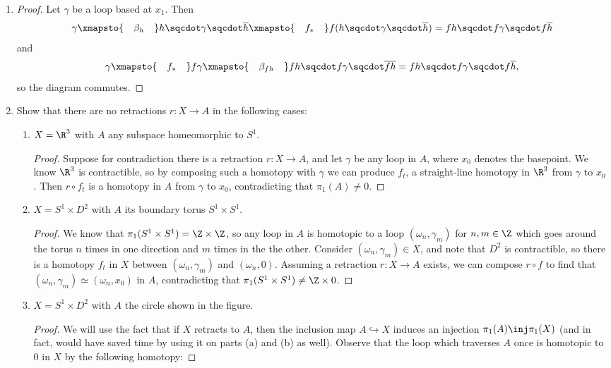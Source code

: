 \documentclass[12pt,letterpaper]{article}
\renewcommand{\inv}[1]{\overline{#1}}
\begin{document}
\begin{enumerate}
\item[]
\begin{proof}
Let $\gamma$ be a loop based at $x_1$. Then 
$$\gamma\xmapsto{\quad\beta_h\quad}h\sqcdot\gamma\sqcdot\inv{h}\xmapsto{\quad f_*\quad}f(h\sqcdot \gamma\sqcdot \inv{h})=fh\sqcdot f\gamma\sqcdot f\inv{h}$$
and 
$$\gamma\xmapsto{\quad f_*\quad} f\gamma \xmapsto{\quad\beta_{fh}\quad}fh\sqcdot f\gamma\sqcdot \overline{fh}=fh\sqcdot f\gamma\sqcdot f\inv{h},$$
so the diagram commutes.
\end{proof}

\pagebreak
\setcounter{enumi}{15}
\item Show that there are no retractions $r:X\to A$ in the following cases:
	\begin{enumerate}[label=(\alph*)]
	\item $X=\R^3$ with $A$ any subspace homeomorphic to $S^1$. 
	\begin{proof}
	Suppose for contradiction there is a retraction $r:X\to A$, and let $\gamma$ be any loop in $A$, where $x_0$ denotes the basepoint. We know $\R^3$ is contractible, so by composing such a homotopy with $\gamma$ we can produce $f_t$, a straight-line homotopy in $\R^3$ from $\gamma$ to $x_0$. Then $r\circ f_t$ is a homotopy in $A$ from $\gamma$ to $x_0$, contradicting that $\pi_1(A)\neq0$. \qedwhitehere
	\end{proof}
	\item $X=S^1\times D^2$ with $A$ its boundary torus $S^1\times S^1$.
	\begin{proof}
	We know that $\pi_1(S^1\times S^1)=\Z\times\Z$, so any loop in $A$ is homotopic to a loop $(\omega_n, \gamma_m)$ for $n,m\in \Z$ which goes around the torus $n$ times in one direction and $m$ times in the the other.  Consider $(\omega_n, \gamma_m)\in X$, and note that $D^2$ is contractible, so there is a homotopy $f_t$ in $X$ between $(\omega_n, \gamma_m)$ and $(\omega_n, 0)$. Assuming a retraction $r:X\to A$ exists, we can compose $r\circ	f$ to find that $(\omega_n, \gamma_m)\simeq(\omega_n, x_0)$ in $A$, contradicting that $\pi_1(S^1\times S^1)\neq \Z\times 0$. \qedwhitehere
	\end{proof}
	\item $X=S^1\times D^2$ with $A$ the circle shown in the figure. 
	\begin{proof}
	We will use the fact that if $X$ retracts to $A$, then the inclusion map $A\hookrightarrow X$ induces an injection $\pi_1(A)\inj\pi_1(X)$ (and in fact, would have saved time by using it on parts (a) and (b) as well). Observe that the loop which traverses $A$ once is homotopic to $0$ in $X$ by the following homotopy: 

\end{proof}
\end{enumerate}
\end{enumerate}
\end{document}
